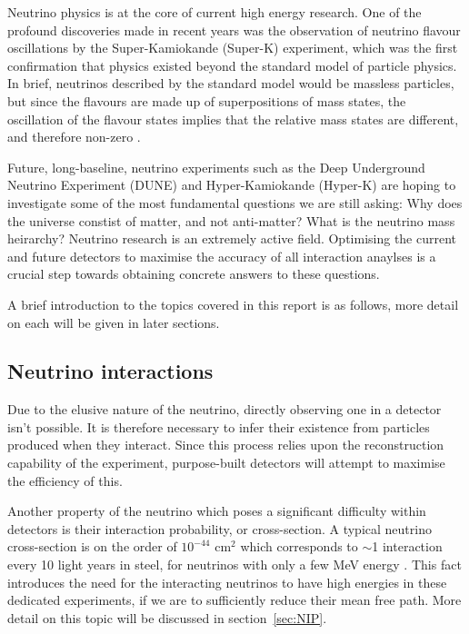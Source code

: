 Neutrino physics is at the core of current high energy research. One of the profound discoveries made in recent years was the observation of neutrino flavour oscillations by the Super-Kamiokande (Super-K) experiment, which was the first confirmation that physics existed beyond the standard model of particle physics. In brief, neutrinos described by the standard model would be massless particles, but since the flavours are made up of superpositions of mass states, the oscillation of
the flavour states implies that the relative mass states are different, and therefore non-zero \cite{nuInt}.

    Future, long-baseline,  neutrino experiments such as the Deep Underground Neutrino Experiment (DUNE) and Hyper-Kamiokande (Hyper-K) are hoping to investigate some of the most fundamental questions we are still asking: Why does the universe constist of matter, and not anti-matter? What is the neutrino mass heirarchy? Neutrino research is an extremely active field. Optimising the current and future detectors to maximise the accuracy of all interaction anaylses is a crucial step towards obtaining concrete answers to these questions. 

    A brief introduction to the topics covered in this report is as follows, more detail on each will be given in later sections. 

\subsection{Neutrino interactions}

Due to the elusive nature of the neutrino, directly observing one in a detector isn't possible. It is therefore necessary to infer their existence from particles produced when they interact. Since this process relies upon the reconstruction capability of the experiment, purpose-built detectors will attempt to maximise the efficiency of this.

Another property of the neutrino which poses a significant difficulty within detectors is their interaction probability, or cross-section. A typical neutrino cross-section is on the order of $ 10^{-44} $ cm$^{2}$ which corresponds to $\sim$1 interaction every 10 light years in steel, for neutrinos with only a few MeV energy \cite{nuOsc}. This fact introduces the need for the interacting neutrinos to have high energies in these dedicated experiments, if we are to sufficiently reduce their mean free path. More detail on this topic will be discussed in section~\ref{sec:NIP}.

